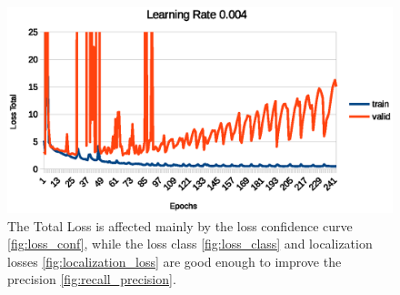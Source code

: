 \documentclass[10pt,twocolumn,letterpaper]{article}
\begin{document}
\begin{figure}[t]
\begin{center}
   \includegraphics[width=1\linewidth]{loss_total.eps}
\end{center}
   \caption{The Total Loss is affected mainly by the loss confidence curve \ref{fig:loss_conf}, 
while the loss class \ref{fig:loss_class} and localization losses \ref{fig:localization_loss} are good enough to improve the precision \ref{fig:recall_precision}.}
\label{fig:loss_total}
\label{fig:onecol}
\end{figure}
\end{document}
